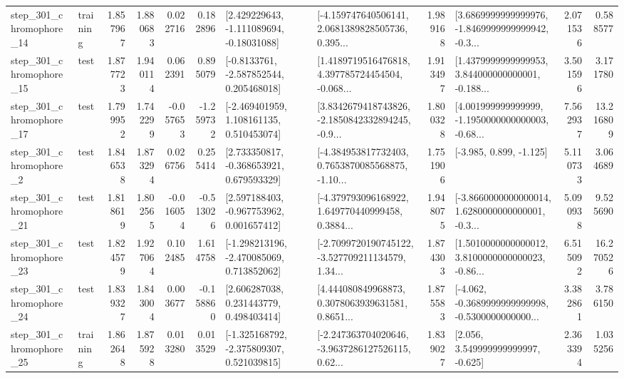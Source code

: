 \begin{tabular}{llrrrrllrlrr}
  step\_301\_chromophore\_14 &  training &      1.857967 &    1.880683 &      0.022716 &  0.182896 &    [2.429229643, -1.111089694, -0.18031088] &  [-4.159747640506141, 2.0681389828505736, 0.395... &       1.989168 &  [3.6869999999999976, -1.8469999999999942, -0.3... &            2.071536 &          0.588577 \\
  step\_301\_chromophore\_15 &      test &      1.877723 &    1.940114 &      0.062391 &  0.895079 &     [-0.8133761, -2.587852544, 0.205468018] &  [1.4189719516476818, 4.397785724454504, -0.068... &       1.913497 &  [1.4379999999999953, 3.844000000000001, -0.188... &            3.501596 &          3.171780 \\
  step\_301\_chromophore\_17 &      test &      1.799952 &    1.742299 &     -0.057653 & -1.259732 &    [-2.469401959, 1.108161135, 0.510453074] &  [3.8342679418743826, -2.1850842332894245, -0.9... &       1.800328 &  [4.001999999999999, -1.1950000000000003, -0.68... &            7.562937 &         13.216809 \\
   step\_301\_chromophore\_2 &      test &      1.846538 &    1.873294 &      0.026756 &  0.255414 &    [2.733350817, -0.368653921, 0.679593329] &  [-4.384953817732403, 0.7653870085568875, -1.10... &       1.751906 &                            [-3.985, 0.899, -1.125] &            5.110733 &          3.064689 \\
  step\_301\_chromophore\_21 &      test &      1.818619 &    1.802565 &     -0.016054 & -0.513026 &    [2.597188403, -0.967753962, 0.001657412] &  [-4.379793096168922, 1.649770440999458, 0.3884... &       1.948075 &  [-3.8660000000000014, 1.6280000000000001, -0.3... &            5.090938 &          9.525690 \\
  step\_301\_chromophore\_23 &      test &      1.824579 &    1.927064 &      0.102485 &  1.614758 &   [-1.298213196, -2.470085069, 0.713852062] &  [-2.7099720190745122, -3.527709211134579, 1.34... &       1.874303 &  [1.5010000000000012, 3.8100000000000023, -0.86... &            6.515092 &         16.270526 \\
  step\_301\_chromophore\_24 &      test &      1.839327 &    1.843004 &      0.003677 & -0.158860 &     [2.606287038, 0.231443779, 0.498403414] &  [4.444080849968873, 0.3078063939631581, 0.8651... &       1.875583 &  [-4.062, -0.3689999999999998, -0.5300000000000... &            3.382861 &          3.786150 \\
  step\_301\_chromophore\_25 &  training &      1.862648 &    1.875928 &      0.013280 &  0.013529 &   [-1.325168792, -2.375809307, 0.521039815] &  [-2.247363704020646, -3.9637286127526115, 0.62... &       1.839027 &                 [2.056, 3.549999999999997, -0.625] &            2.363394 &          1.035256 \\

\end{tabular}
